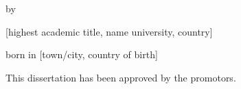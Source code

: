 \begin{titlepage}
\begin{center}
    \bigskip
    \bigskip

    by

    \bigskip
    \bigskip

    \makeatletter
    \author{$for(authors)$$it.name.literal$$sep$ \and $endfor$}
    \makeatother
    \author{$for(authors)$$it.name.literal$$sep$ \and $endfor$}
    \bigskip
    \bigskip

    [highest academic title, name university, country]

    born in [town/city, country of birth]

    \vspace*{2\bigskipamount}

\end{center}

\clearpage
\thispagestyle{empty}

\noindent This dissertation has been approved by the promotors.


\end{titlepage}
